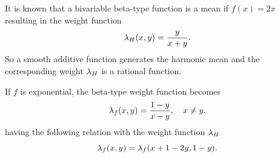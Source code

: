 \documentclass{amsart}
\makeatletter
\theoremstyle{plain}
\numberwithin{equation}{section}
\def\lambda{\Greekmath 0115 }%
\def\FindBoldGroup{%
   {\setbox0=\hbox{$\mathbf{x\global\edef\theboldgroup{\the\mathgroup}}$}}%
}
\def\Greekmath#1#2#3#4{%
    \if@compatibility
        \ifnum\mathgroup=\symbold
           \mathchoice{\mbox{\boldmath$\displaystyle\mathchar"#1#2#3#4$}}%
                      {\mbox{\boldmath$\textstyle\mathchar"#1#2#3#4$}}%
                      {\mbox{\boldmath$\scriptstyle\mathchar"#1#2#3#4$}}%
                      {\mbox{\boldmath$\scriptscriptstyle\mathchar"#1#2#3#4$}}%
        \else
           \mathchar"#1#2#3#4%
        \fi 
    \else 
        \FindBoldGroup
        \ifnum\mathgroup=\theboldgroup %
           \mathchoice{\mbox{\boldmath$\displaystyle\mathchar"#1#2#3#4$}}%
                      {\mbox{\boldmath$\textstyle\mathchar"#1#2#3#4$}}%
                      {\mbox{\boldmath$\scriptstyle\mathchar"#1#2#3#4$}}%
                      {\mbox{\boldmath$\scriptscriptstyle\mathchar"#1#2#3#4$}}%
        \else
           \mathchar"#1#2#3#4%
        \fi     	    
	  \fi}
\makeatother
\begin{document}
It is known %
that a bivariable beta-type function is a mean if $f(x)=2x$
resulting in the weight function
\begin{equation*}
	\lambda_H (x,y)=\frac{y}{x+y}.	
\end{equation*}
So a smooth additive function generates the harmonic mean and the corresponding weight $\lambda_H$ is a rational function.

If $f$ is exponential, the beta-type weight function becomes
\begin{equation*}
	\lambda_f (x,y)=\frac{1-y}{x-y}, \quad x \neq y,	
\end{equation*}
having the following relation with the weight function $\lambda_H$
\begin{equation*}
	\lambda_f (x,y)=\lambda_f (x+1-2y,1-y).	
\end{equation*}

\end{document}
